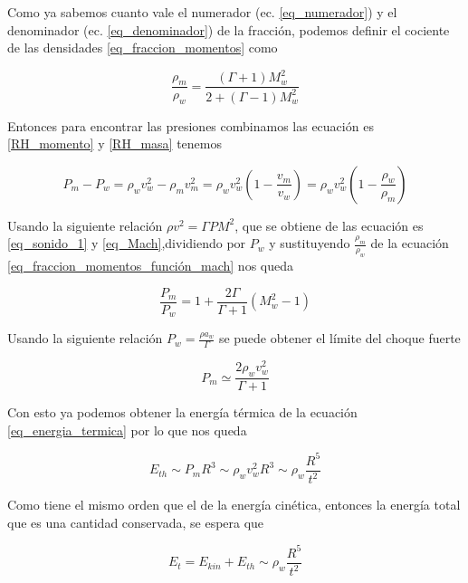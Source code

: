 \documentclass[12pt,a4paper]{book}
\begin{document}
Como ya sabemos cuanto vale el numerador (ec. \ref{eq_numerador}) y el denominador (ec. \ref{eq_denominador})
de la fracción, podemos definir el cociente de las densidades \ref{eq_fraccion_momentos} como 

\begin{equation}\label{eq_fraccion_momentos_función_mach}
  \frac{\rho_m}{\rho_w} = \frac{\left( \Gamma +1 \right) M_w^2}{2+ \left( \Gamma -1 \right) M_w^2}
\end{equation}

Entonces para encontrar las presiones combinamos las ecuación  es \ref{RH_momento} y \ref{RH_masa} tenemos

\begin{equation}
  P_m - P_w = \rho_w v_w^2 - \rho_m v_m^2 = \rho_w v_w^2 \left( 1 - \frac{v_m}{v_w}\right) = \rho_w v_w^2 \left( 1 - \frac{\rho_w}{\rho_m}\right)
\end{equation}

Usando la siguiente relación $\rho v^2 = \Gamma P M^2$, que se obtiene de las ecuación  es \ref{eq_sonido_1} y
\ref{eq_Mach},dividiendo por $P_w$ y sustituyendo  $\frac{\rho_m}{\rho_w}$ de la ecuación 
\ref{eq_fraccion_momentos_función_mach}
nos queda

\begin{equation} \label{eq_fraccion_Presiones}
  \frac{P_m}{P_w} = 1 + \frac{2 \Gamma}{\Gamma + 1} \left( M_w^2 -1\right)
\end{equation}

Usando la siguiente relación $ P_w = \frac{\rho a_w }{\Gamma}$ se puede obtener el límite del choque fuerte

\begin{equation}
  P_m  \simeq \frac{2 \rho_w v_w^2}{\Gamma + 1}
\end{equation}

Con esto ya podemos obtener la energía térmica de la ecuación \ref{eq_energia_termica} por lo que nos queda 

\begin{equation}
  E_{th} \sim P_m R^3 \sim \rho_w v_w^2 R^3 \sim \rho_w \frac{R^5}{t^2}
\end{equation}

Como tiene el mismo orden que el de la energía cinética, entonces la energía total que es una cantidad conservada, se espera que

\begin{equation}
  E_t = E_{kin} + E_{th} \sim \rho_w \frac{R^5}{t^2}
\end{equation}
\end{document}
